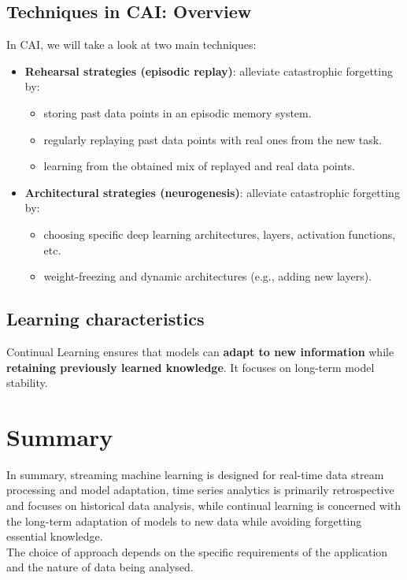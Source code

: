 \subsection{Techniques in CAI: Overview}

In CAI, we will take a look at two main techniques:

\begin{itemize}
    \item \textbf{Rehearsal strategies (episodic replay)}: alleviate catastrophic
    forgetting by:
    \begin{itemize}
        \item storing past data points in an episodic memory system.
        \item regularly replaying past data points with real ones from the
        new task.
        \item learning from the obtained mix of replayed and real data points.
    \end{itemize}

    \item \textbf{Architectural strategies (neurogenesis)}: alleviate catastrophic
    forgetting by:
    \begin{itemize}
        \item choosing specific deep learning architectures, layers,
        activation functions, etc.

        \item weight-freezing and dynamic architectures (e.g., adding
        new layers).
    \end{itemize}
\end{itemize}

\subsection{Learning characteristics}

Continual Learning ensures that models can \textbf{adapt to new information} while \textbf{
retaining previously learned knowledge}. It focuses on long-term model stability.

\section{Summary}

In summary, streaming machine learning is designed for real-time
data stream processing and model adaptation, time series analytics is
primarily retrospective and focuses on historical data analysis, while
continual learning is concerned with the long-term adaptation of
models to new data while avoiding forgetting essential knowledge.\\

The choice of approach depends on the specific requirements of the application
and the nature of data being analysed.


